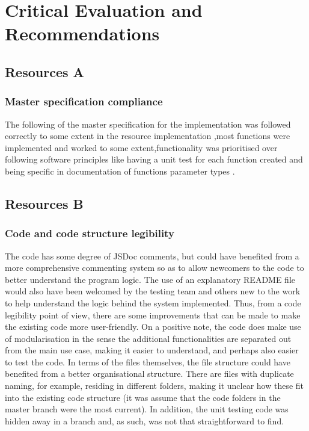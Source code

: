 \documentclass[a4paper]{article}
\begin{document}
\section {Critical Evaluation and Recommendations}
\subsection {Resources A}
\subsubsection {Master specification compliance}
The following of the master specification for the implementation was followed correctly to some extent in the resource implementation ,most functions were implemented and worked to some extent,functionality was prioritised over following software principles like having a unit test for each function created and being specific in documentation of functions parameter types .

\subsection {Resources B}
\subsubsection {Code and code structure legibility}
The code has some degree of JSDoc comments, but could have benefited from a more comprehensive commenting system so as to allow newcomers to the code to better understand the program logic. The use of an explanatory README file would also have been welcomed by the testing team and others new to the work to help understand the logic behind the system implemented. Thus, from a code legibility point of view, there are some improvements that can be made to make the existing code more user-friendly. On a positive note, the code does make use of modularisation in the sense the additional functionalities are separated out from the main use case, making it easier to understand, and perhaps also easier to test the code.
In terms of the files themselves, the file structure could have benefited from a better organisational structure. There are files with duplicate naming, for example, residing in different folders, making it unclear how these fit into the existing code structure (it was assume that the code folders in the master branch were the most current).  In addition, the unit testing code was hidden away in a branch and, as such, was not that straightforward to find.
\end{document}
